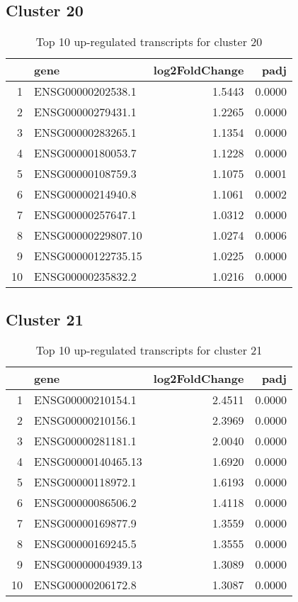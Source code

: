 \documentclass{article}
\begin{document}
\subsection{Cluster 20 }
\begin{table}[H]
\centering
\begin{tabular}{rlrr}
  \hline
 & gene & log2FoldChange & padj \\ 
  \hline
1 & ENSG00000202538.1 & 1.5443 & 0.0000 \\ 
  2 & ENSG00000279431.1 & 1.2265 & 0.0000 \\ 
  3 & ENSG00000283265.1 & 1.1354 & 0.0000 \\ 
  4 & ENSG00000180053.7 & 1.1228 & 0.0000 \\ 
  5 & ENSG00000108759.3 & 1.1075 & 0.0001 \\ 
  6 & ENSG00000214940.8 & 1.1061 & 0.0002 \\ 
  7 & ENSG00000257647.1 & 1.0312 & 0.0000 \\ 
  8 & ENSG00000229807.10 & 1.0274 & 0.0006 \\ 
  9 & ENSG00000122735.15 & 1.0225 & 0.0000 \\ 
  10 & ENSG00000235832.2 & 1.0216 & 0.0000 \\ 
   \hline
\end{tabular}
\caption{Top 10 up-regulated transcripts for cluster 20} 
\label{tab:q3_1_20}
\end{table}
\subsection{Cluster 21 }
\begin{table}[H]
\centering
\begin{tabular}{rlrr}
  \hline
 & gene & log2FoldChange & padj \\ 
  \hline
1 & ENSG00000210154.1 & 2.4511 & 0.0000 \\ 
  2 & ENSG00000210156.1 & 2.3969 & 0.0000 \\ 
  3 & ENSG00000281181.1 & 2.0040 & 0.0000 \\ 
  4 & ENSG00000140465.13 & 1.6920 & 0.0000 \\ 
  5 & ENSG00000118972.1 & 1.6193 & 0.0000 \\ 
  6 & ENSG00000086506.2 & 1.4118 & 0.0000 \\ 
  7 & ENSG00000169877.9 & 1.3559 & 0.0000 \\ 
  8 & ENSG00000169245.5 & 1.3555 & 0.0000 \\ 
  9 & ENSG00000004939.13 & 1.3089 & 0.0000 \\ 
  10 & ENSG00000206172.8 & 1.3087 & 0.0000 \\ 
   \hline
\end{tabular}
\caption{Top 10 up-regulated transcripts for cluster 21} 
\label{tab:q3_1_21}
\end{table}
\end{document}
